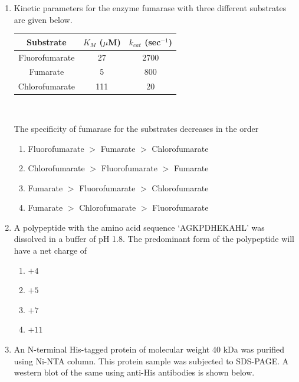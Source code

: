 \documentclass[journal,12pt,onecolumn]{IEEEtran}
\begin{document}
\begin{enumerate}[label=\arabic*.,resume]
\item Kinetic parameters for the enzyme fumarase with three different substrates are given below.\\
\begin{center}
\begin{tabular}{|c|c|c|}
\hline
Substrate & $K_M$ ($\mu$M) & $k_{cat}$ (sec$^{-1}$) \\
\hline
Fluorofumarate & 27 & 2700 \\
Fumarate & 5 & 800 \\
Chlorofumarate & 111 & 20 \\
\hline
\end{tabular}\\
\end{center}

The specificity of fumarase for the substrates decreases in the order

\begin{enumerate}[label=(\Alph*)]
\item Fluorofumarate $>$ Fumarate $>$ Chlorofumarate
\item Chlorofumarate $>$ Fluorofumarate $>$ Fumarate
\item Fumarate $>$ Fluorofumarate $>$ Chlorofumarate
\item Fumarate $>$ Chlorofumarate $>$ Fluorofumarate
\end{enumerate}

\item A polypeptide with the amino acid sequence ‘AGKPDHEKAHL’ was dissolved in a buffer of pH 1.8. The predominant form of the polypeptide will have a net charge of

\begin{multicols}{4}
\begin{enumerate}[label=(\Alph*)]
\item $+4$
\item $+5$
\item $+7$
\item $+11$
\end{enumerate}
\end{multicols}

\item An N-terminal His-tagged protein of molecular weight 40 kDa was purified using Ni-NTA column. This protein sample was subjected to SDS-PAGE. A western blot of the same using anti-His antibodies is shown below.


\end{enumerate}
\end{document}
